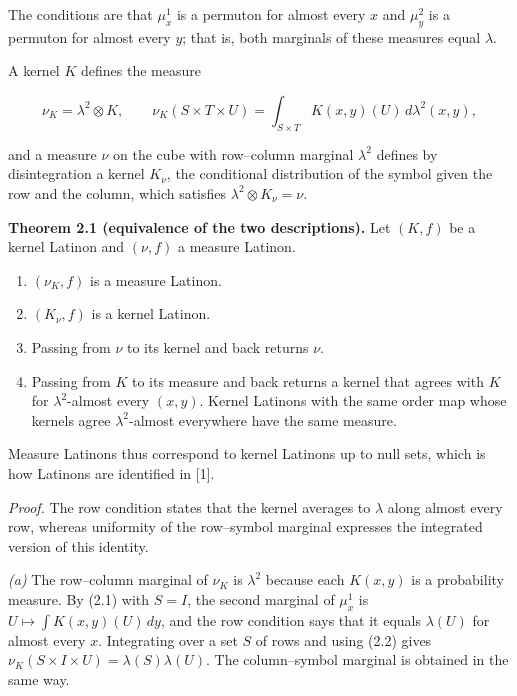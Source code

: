\documentclass[english,11pt,a4paper]{article}
\begin{document}
The conditions are that \(\mu^1_x\) is a permuton for almost every \(x\) and \(\mu^2_y\) is a permuton for almost every \(y\); that is, both marginals of these measures equal \(\lambda\).

A kernel \(K\) defines the measure

\nopagebreak[4]
\[\nu_K=\lambda^2\otimes K,\qquad
\nu_K(S\times T\times U)=\int_{S\times T}K(x,y)(U)\,d\lambda^2(x,y),\tag{2.2}\]

and a measure \(\nu\) on the cube with row--column marginal \(\lambda^2\) defines by disintegration a kernel \(K_\nu\), the conditional distribution of the symbol given the row and the column, which satisfies \(\lambda^2\otimes K_\nu=\nu\).

\textbf{Theorem 2.1 (equivalence of the two descriptions).} Let \((K,f)\) be a kernel Latinon and \((\nu,f)\) a measure Latinon.

\begin{enumerate}
\def\labelenumi{(\alph{enumi})}
\item
  \((\nu_K,f)\) is a measure Latinon.
\item
  \((K_\nu,f)\) is a kernel Latinon.
\item
  Passing from \(\nu\) to its kernel and back returns \(\nu\).
\item
  Passing from \(K\) to its measure and back returns a kernel that agrees with \(K\) for \(\lambda^2\)-almost every \((x,y)\). Kernel Latinons with the same order map whose kernels agree \(\lambda^2\)-almost everywhere have the same measure.
\end{enumerate}

Measure Latinons thus correspond to kernel Latinons up to null sets, which is how Latinons are identified in {[}1{]}.

\emph{Proof.} The row condition states that the kernel averages to \(\lambda\) along almost every row, whereas uniformity of the row--symbol marginal expresses the integrated version of this identity.

\emph{(a)} The row--column marginal of \(\nu_K\) is \(\lambda^2\) because each \(K(x,y)\) is a probability measure. By (2.1) with \(S=I\), the second marginal of \(\mu^1_x\) is \(U\mapsto\int K(x,y)(U)\,dy\), and the row condition says that it equals \(\lambda(U)\) for almost every \(x\). Integrating over a set \(S\) of rows and using (2.2) gives \(\nu_K(S\times I\times U)=\lambda(S)\lambda(U)\). The column--symbol marginal is obtained in the same way.
\end{document}
